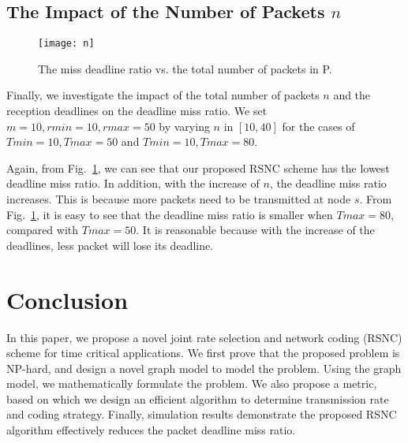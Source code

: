 \documentclass[journal]{IEEEtran}
\begin{document}
\subsection{The Impact of the Number of Packets $n$}\vspace{-0.02in}
\begin{figure}[t]
\begin{center}\vspace{-0.08in}
\texttt{[image: n]}\vspace{-0.1in}
\caption{The miss deadline ratio vs. the total number of packets in P.} \vspace{-0.1in}\vspace{-0.15in}\label{sim.n}
\end{center}\vspace{-0.05in}
\end{figure}

Finally, we investigate the impact of the total number of packets $n$ and the reception deadlines on the deadline miss ratio. We set $m=10, rmin=10,rmax=50$ by varying $n$ in $[10,40]$ for the cases of $Tmin=10, Tmax=50$ and $Tmin=10,Tmax=80$.

Again, from Fig.~\ref{sim.n}, we can see that our proposed RSNC scheme has the lowest deadline miss ratio.
In addition, with the increase of $n$, the deadline miss ratio increases. This is because more packets need to be transmitted
at node $s$. From Fig.~\ref{sim.n}, it is easy to see that the deadline miss ratio is smaller when $Tmax=80$, compared with $Tmax=50$. It is reasonable because with the increase of the deadlines, less packet will lose its deadline.

\vspace{-0.12in}
\section{Conclusion}\label{Sec.conclusion}
In this paper, we propose a novel joint rate selection and network coding (RSNC) scheme for time critical applications. We first prove that the proposed problem is NP-hard, and design a novel graph model to model the problem. Using the graph model, we mathematically formulate the problem. We also propose a metric, based on which we design an efficient algorithm to determine transmission rate and coding strategy. Finally, simulation results demonstrate the proposed RSNC algorithm effectively reduces the packet deadline miss ratio.

\vspace{-0.07in}
\end{document}
